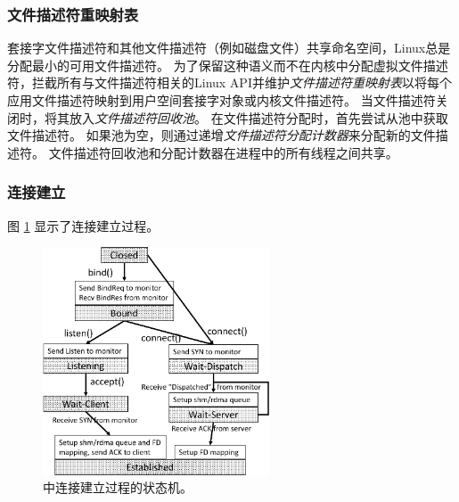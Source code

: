 

\subsubsection{文件描述符重映射表}
\label{socksdirect:subsubsec:fd-remapping-table}



套接字文件描述符和其他文件描述符（例如磁盘文件）共享命名空间，Linux总是分配最小的可用文件描述符。
为了保留这种语义而不在内核中分配虚拟文件描述符，\libipc {}拦截所有与文件描述符相关的Linux API并维护\emph {文件描述符重映射表}以将每个应用文件描述符映射到用户空间套接字对象或内核文件描述符。
当文件描述符关闭时，\libipc {}将其放入\emph {文件描述符回收池}。
在文件描述符分配时，\libipc {}首先尝试从池中获取文件描述符。
如果池为空，则通过递增\emph {文件描述符分配计数器}来分配新的文件描述符。
文件描述符回收池和分配计数器在进程中的所有线程之间共享。

\subsubsection{连接建立}


图 \ref {socksdirect:fig:conn-setup} 显示了连接建立过程。


\begin{figure}[htbp]
	\centering
	\includegraphics[width=0.6\textwidth]{images/conn-setup-new}
	\caption{\libipc{} 中连接建立过程的状态机。}
	\label{socksdirect:fig:conn-setup}
\end{figure}



